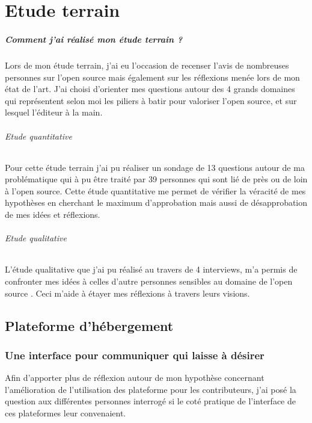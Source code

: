 \chapter{Etude terrain} %

	\paragraph{Comment j'ai réalisé mon étude terrain ? \\}

		Lors de mon étude terrain, j'ai eu l'occasion de recenser l'avis de nombreuses personnes sur l'open source mais également sur les réflexions menée lors de mon état de l'art.
		J'ai choisi d'orienter mes questions autour des 4 grands domaines qui représentent selon moi les piliers à batir pour valoriser l'open source, et sur lesquel l'éditeur à la main.

		\subparagraph{Etude quantitative \\}

		Pour cette étude terrain j'ai pu réaliser un sondage de 13 questions autour de ma problématique qui à pu être traité par 39 personnes qui sont lié de près ou de loin à l'open source. Cette étude quantitative me permet de vérifier la véracité de mes hypothèses en cherchant le maximum d'approbation mais aussi de désapprobation de mes idées et réflexions.

		\subparagraph{Etude qualitative \\}

		L'étude qualitative que j'ai pu réalisé au travers de 4 interviews, m'a permis de confronter mes idées à celles d'autre personnes sensibles au domaine de l'open source . Ceci m'aide à étayer mes réflexions à travers leurs visions.

	\section{Plateforme d'hébergement}

		\subsection{Une interface pour communiquer qui laisse à désirer}

			Afin d'apporter plus de réflexion autour de mon hypothèse concernant l'amélioration de l'utilisation des plateforme pour les contributeurs, j'ai posé la question aux différentes personnes interrogé si le coté pratique de l'interface de ces plateformes leur convenaient.\\

